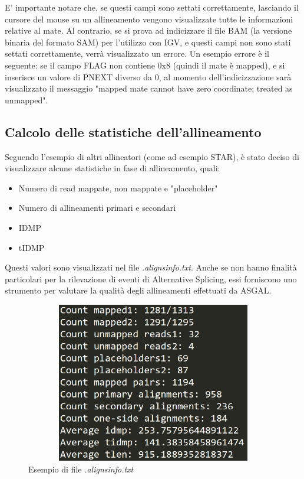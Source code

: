 \newpage

E' importante notare che, se questi campi sono settati correttamente, lasciando il cursore del mouse su un allineamento vengono visualizzate tutte le informazioni relative al mate. Al contrario, se si prova ad indicizzare il file BAM (la versione binaria del formato SAM) per l'utilizzo con IGV, e questi campi non sono stati settati correttamente, verrà visualizzato un errore. Un esempio errore è il seguente: se il campo FLAG non contiene 0x8 (quindi il mate è mapped), e si inserisce un valore di PNEXT diverso da 0, al momento dell'indicizzazione sarà visualizzato il messaggio "mapped mate cannot have zero coordinate; treated as unmapped".

\subsection{Calcolo delle statistiche dell'allineamento}
Seguendo l'esempio di altri allineatori (come ad esempio STAR), è stato deciso di visualizzare alcune statistiche in fase di allineamento, quali:

\begin{itemize}
	\item Numero di read mappate, non mappate e "placeholder"
	\item Numero di allineamenti primari e secondari
	\item IDMP
	\item tIDMP
\end{itemize}

Questi valori sono visualizzati nel file \textit{.alignsinfo.txt}. Anche se non hanno finalità particolari per la rilevazione di eventi di Alternative Splicing, essi forniscono uno strumento per valutare la qualità degli allineamenti effettuati da ASGAL.

\begin{figure}[h!]
	\centering
	\includegraphics[height=7cm,width=12cm]{images/aligninfo.png}
  \caption{Esempio di file \textit{.alignsinfo.txt}}
  \label{fig:AlternativeSplicingTypes}
\end{figure}